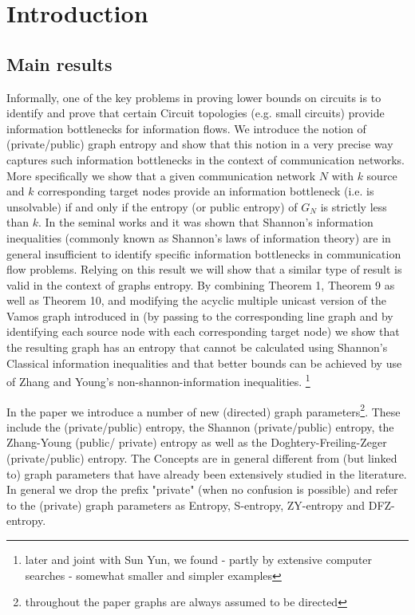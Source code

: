 \documentclass[12pt]{article}
\begin{document}
\section{Introduction}
\subsection{Main results}
Informally, one of the key problems in proving lower bounds on circuits is to identify and prove that certain Circuit topologies (e.g. small circuits) provide information bottlenecks for information flows. 
We introduce the notion of (private/public) graph entropy and show that this notion in a very precise way captures such information bottlenecks in the context of communication networks.  More specifically we show that a given communication network $N$ with $k$ source and $k$ corresponding target nodes provide an information bottleneck (i.e. is unsolvable) if and only if the entropy (or public entropy) of $G_N$ is strictly less than $k$. In the seminal works \cite{ZY97,ZY97A} and  \cite{DFZ07} it was shown that Shannon's information inequalities (commonly known as Shannon's laws of information theory)
are in general insufficient to identify specific information bottlenecks in communication flow problems. 
Relying on this result we will show that a similar type of result is valid in the context of graphs entropy.
By combining Theorem 1, Theorem 9 as well as Theorem 10, and modifying  the acyclic multiple unicast version of the Vamos graph introduced in \cite{DFZ07} (by passing to the corresponding line graph and by identifying each source node with each corresponding target node) we show that the resulting graph  has an entropy that cannot be calculated using Shannon's Classical information inequalities and that better bounds can be achieved by use of Zhang and Young's non-shannon-information inequalities. \footnote{later and joint with Sun Yun, we found - partly by extensive computer searches - somewhat smaller and simpler examples }

In the paper we introduce a number of new (directed) graph parameters\footnote{throughout the paper graphs are always assumed to be directed}. These include the (private/public) entropy,  the Shannon (private/public) entropy,  the Zhang-Young (public/ private) entropy  as well as the Doghtery-Freiling-Zeger (private/public) entropy.  The Concepts are in general different from (but linked to) graph parameters that have already been extensively studied in the literature.  
In general we drop the prefix "private" (when no confusion is possible) and refer to the (private) graph parameters as Entropy, S-entropy, ZY-entropy and DFZ-entropy.   
\end{document}
